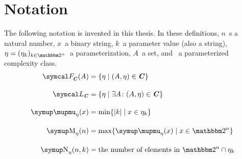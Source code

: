 \chapter*{Notation}

The following notation is invented in this thesis.
In these definitions, $n$~s a natural number, $x$~a binary string, $k$~a parameter value (also a string), $\eta = (\eta_k)_{k \in \binary^+}$~a parameterization, $A$~a set, and ~a parameterized complexity class. \\[1em]
\begin{align*}
  \calF_\cl{\itshape C}(A) &\deq \{\eta \st (A, \eta) \in \cl{\itshape C}\} \\[1em]
  \calL_\cl{\itshape C} &\deq \{\eta \st \exists A\colon (A, \eta) \in \cl{\itshape C}\} \\[1em]
  \mu_\eta(x) &\deq \min\{\length{k} \st x \in \eta_k\} \\[1em]
  \upM_\eta(n) &\deq \max\{\mu_\eta(x) \st x \in \binary^n\} \\[1em]
  \upN_\eta(n, k) &\deq \text{the number of elements in }\binary^n \cap \eta_k
\end{align*}

